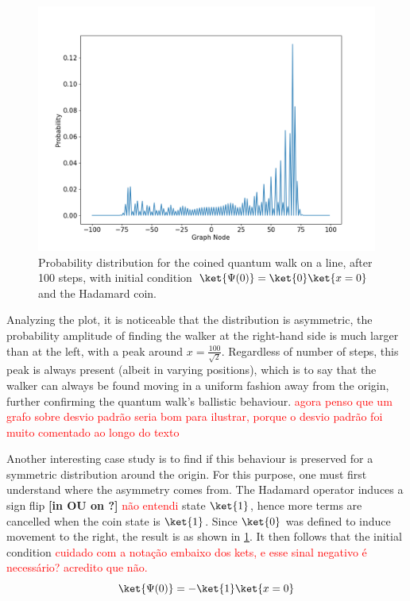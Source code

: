     	        \begin{figure}[!h]
                    \centering
                    \includegraphics[scale=0.40]{img/CoinedQuantumWalk/Coinedpsi00.png}
                    \caption{Probability distribution for the coined quantum walk on a line, after 100 steps, with initial condition $\ket{\Psi(0)}=\ket{0}\ket{x=0}$ and the Hadamard coin.} 
                    \label{fig:fig1}
                \end{figure}
                
                Analyzing the plot, it is noticeable that the distribution is asymmetric, the probability amplitude of finding the walker at the right-hand side is much larger than at the left, with a peak around $x=\frac{100}{\sqrt{2}}$. Regardless of number of steps, this peak is always present (albeit in varying positions), which is to say that the walker can always be found moving in a uniform fashion away from the origin, further confirming the quantum walk's ballistic behaviour. \textcolor{red}{agora penso que um grafo sobre desvio padrão seria bom para ilustrar, porque o desvio padrão foi muito comentado ao longo do texto}\par
                Another interesting case study is to find if this behaviour is preserved for a symmetric distribution around the origin. For this purpose, one must first understand where the asymmetry comes from. The Hadamard operator induces a sign flip \textbf{[in OU on ?]} \textcolor{red}{não entendi} state $\ket{1}$, hence more terms are cancelled when the coin state is $\ket{1}$. Since $\ket{0}$ was defined to induce movement to the right, the result is as shown in \ref{fig:fig1}. It then follows that the initial condition \textcolor{red}{cuidado com a notação embaixo dos kets, e esse sinal negativo é necessário? acredito que não.}
                \begin{equation}
                    \ket{\Psi(0)} = -\ket{1}\ket{x=0}
                    \label{eq:12}
                \end{equation}
                
